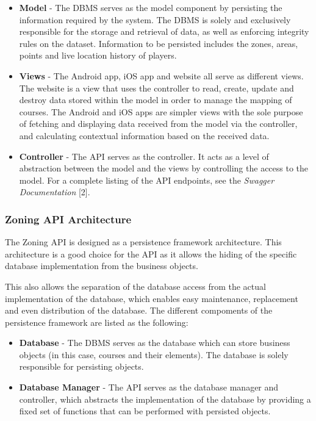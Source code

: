 \documentclass{article}
\begin{document}
    \begin{itemize}
        \item \textbf{Model} - The DBMS serves as the model component by
            persisting the information required by the system. The DBMS is
            solely and exclusively responsible for the storage and retrieval of
            data, as well as enforcing integrity rules on the dataset.
            Information to be persisted includes the zones, areas, points and
            live location history of players.
        \item \textbf{Views} - The Android app, iOS app and website all serve
            as different views. The website is a view that uses the controller
            to read, create, update and destroy data stored within the model in
            order to manage the mapping of courses. The Android and iOS apps
            are simpler views with the sole purpose of fetching and displaying
            data received from the model via the controller, and calculating
            contextual information based on the received data.
        \item \textbf{Controller} - The API serves as the controller. It acts
            as a level of abstraction between the model and the views by
            controlling the access to the model. For a complete listing of the
            API endpoints, see the \textit{Swagger Documentation} [2].
    \end{itemize}

    \subsubsection{Zoning API Architecture}

    The Zoning API is designed as a persistence framework architecture. This
    architecture is a good choice for the API as it allows the hiding of the
    specific database implementation from the business objects.

    This also allows the separation of the database access from the actual
    implementation of the database, which enables easy maintenance, replacement
    and even distribution of the database. The different compoments of the
    persistence framework are listed as the following:

    \begin{itemize}
        \item \textbf{Database} - The DBMS serves as the database which can
            store business objects (in this case, courses and their elements).
            The database is solely responsible for persisting objects.
        \item \textbf{Database Manager} - The API serves as the database
            manager and controller, which abstracts the implementation of the
            database by providing a fixed set of functions that can be
            performed with persisted objects.
    \end{itemize}
\end{document}
